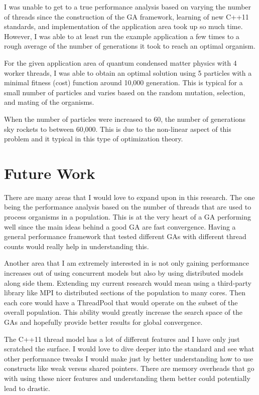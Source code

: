 \documentclass{acm_proc_article-sp}
\begin{document}
I was unable to get to a true performance analysis based on varying the number of threads since the construction of the GA framework, learning of new C++11 standards, and implementation of the application area took up so much time. However, I was able to at least run the example application a few times to a rough average of the number of generations it took to reach an optimal organism.

For the given application area of quantum condensed matter physics with 4 worker threads, I was able to obtain an optimal solution using 5 particles with a minimal fitness (cost) function around 10,000 generation. This is typical for a small number of particles and varies based on the random mutation, selection, and mating of the organisms.

When the number of particles were increased to 60, the number of generations sky rockets to between 60,000. This is due to the non-linear aspect of this problem and it typical in this type of optimization theory.


%
%
\section{Future Work}

There are many areas that I would love to expand upon in this research. The one being the performance analysis based on the number of threads that are used to process organisms in a population. This is at the very heart of a GA performing well since the main ideas behind a good GA are fast convergence. Having a general performance framework that tested different GAs with different thread counts would really help in understanding this.

Another area that I am extremely interested in is not only gaining performance increases out of using concurrent models but also by using distributed models along side them. Extending my current research would mean using a third-party library like MPI to distributed sections of the population to many cores. Then each core would have a ThreadPool that would operate on the subset of the overall population. This ability would greatly increase the search space of the GAs and hopefully provide better results for global convergence.

The C++11 thread model has a lot of different features and I have only just scratched the surface. I would love to dive deeper into the standard and see what other performance tweaks I would make just by better understanding how to use constructs like weak versus shared pointers. There are memory overheads that go with using these nicer features and understanding them better could potentially lead to drastic.
\end{document}
